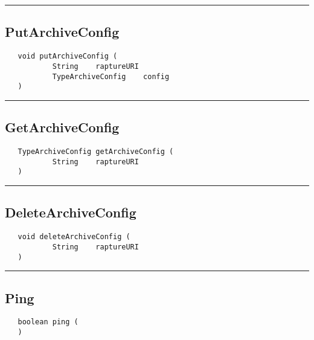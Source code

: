 \rule{15cm}{2pt}
\subsection{PutArchiveConfig}
\label{Api:PutArchiveConfig}
\begin{verbatim}
   void putArchiveConfig (
           String    raptureURI
           TypeArchiveConfig    config
   )
\end{verbatim}



\rule{15cm}{2pt}
\subsection{GetArchiveConfig}
\label{Api:GetArchiveConfig}
\begin{verbatim}
   TypeArchiveConfig getArchiveConfig (
           String    raptureURI
   )
\end{verbatim}



\rule{15cm}{2pt}
\subsection{DeleteArchiveConfig}
\label{Api:DeleteArchiveConfig}
\begin{verbatim}
   void deleteArchiveConfig (
           String    raptureURI
   )
\end{verbatim}



\rule{15cm}{2pt}
\subsection{Ping}
\label{Api:Ping}
\begin{verbatim}
   boolean ping (
   )
\end{verbatim}



